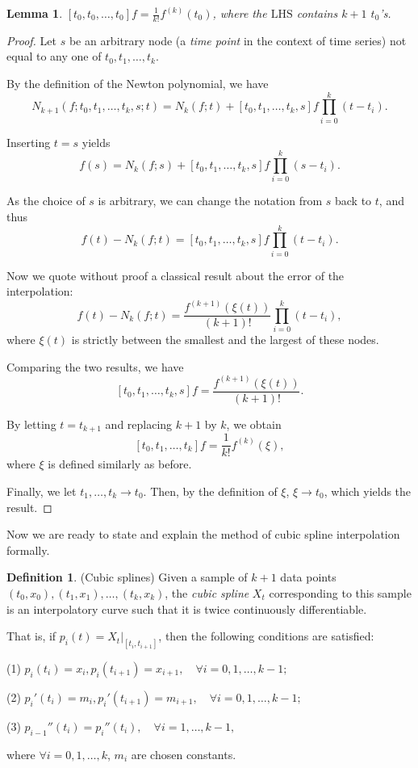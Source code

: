 \documentclass[a4paper,11pt,titlepage]{article}
\theoremstyle{definition}
\newtheorem{definition}{Definition}[section]
\theoremstyle{plain}
\newtheorem{lemma}[theorem]{Lemma}
\theoremstyle{remark}
\begin{document}
\begin{lemma}\label{lemma53}
    $[t_0,t_0,\dots,t_0]f=\frac{1}{k!}f^{(k)}(t_0)$, where the $\mathrm{LHS}$ contains $k+1$ $t_0$'s.
\end{lemma}
\begin{proof}
    \cite{Gautschi2012} Let $s$ be an arbitrary node (a \textit{time point} in the context of time series) not equal to any one of $t_0,t_1,\dots,t_k$.
    
    By the definition of the Newton polynomial, we have
    $$N_{k+1}(f;t_0,t_1,\dots,t_k,s;t)=N_k(f;t)+[t_0,t_1,\dots,t_k,s]f\prod_{i=0}^k(t-t_i).$$
    
    Inserting $t=s$ yields
    $$f(s)=N_k(f;s)+[t_0,t_1,\dots,t_k,s]f\prod_{i=0}^k(s-t_i).$$

    As the choice of $s$ is arbitrary, we can change the notation from $s$ back to $t$, and thus
    $$f(t)-N_k(f;t)=[t_0,t_1,\dots,t_k,s]f\prod_{i=0}^k(t-t_i).$$

    Now we quote without proof a classical result about the error of the interpolation:
    $$f(t)-N_k(f;t)=\frac{f^{(k+1)}(\xi(t))}{(k+1)!}\prod_{i=0}^k(t-t_i),$$
    where $\xi(t)$ is strictly between the smallest and the largest of these nodes.

    Comparing the two results, we have
    $$[t_0,t_1,\dots,t_k,s]f=\frac{f^{(k+1)}(\xi(t))}{(k+1)!}.$$
    
    By letting $t=t_{k+1}$ and replacing $k+1$ by $k$, we obtain
    $$[t_0,t_1,\dots,t_k]f=\frac{1}{k!}f^{(k)}(\xi),$$
    where $\xi$ is defined similarly as before.

    Finally, we let $t_1,\dots,t_k\rightarrow t_0$. Then, by the definition of $\xi$, $\xi\rightarrow t_0$, which yields the result.
\end{proof}

Now we are ready to state and explain the method of cubic spline interpolation formally.

\begin{definition}
    (Cubic splines) Given a sample of $k+1$ data points
$(t_0,x_0), (t_1,x_1), \dots, (t_k,x_k)$, the \textit{cubic spline} $X_t$ corresponding to this sample is an interpolatory curve such that it is twice continuously differentiable.

That is, if $p_i(t)=X_t|_{[t_i,t_{i+1}]}$, then the following conditions are satisfied:

(1) $p_i(t_i)=x_i, p_i(t_{i+1})=x_{i+1},\quad\forall i=0,1,\dots,k-1;$

(2) $p_i'(t_i)=m_i, p_i'(t_{i+1})=m_{i+1},\quad\forall i=0,1,\dots,k-1;$

(3) $p_{i-1}''(t_i)=p_i''(t_i),\quad\forall i=1,\dots,k-1,$

where $\forall i=0,1,\dots,k$, $m_i$ are chosen constants.
\end{definition}
\end{document}
